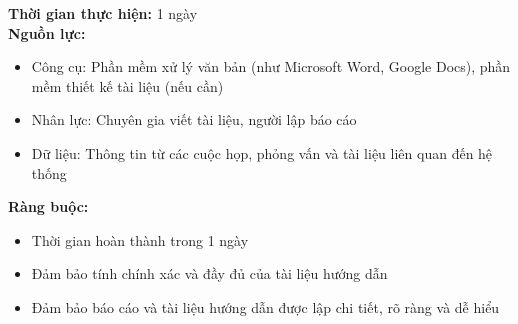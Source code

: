 {\begin{minipage}{\textwidth}
\begin{itemize}
    \end{itemize}
    \noindent \textbf{Thời gian thực hiện:} 1 ngày \\
    \noindent \textbf{Nguồn lực:}
    \begin{itemize}
        \item Công cụ: Phần mềm xử lý văn bản (như Microsoft Word, Google Docs), phần mềm thiết kế tài liệu (nếu cần)
        \item Nhân lực: Chuyên gia viết tài liệu, người lập báo cáo
        \item Dữ liệu: Thông tin từ các cuộc họp, phỏng vấn và tài liệu liên quan đến hệ thống
    \end{itemize}
    \noindent \textbf{Ràng buộc:}
    \begin{itemize}
        \item Thời gian hoàn thành trong 1 ngày
        \item Đảm bảo tính chính xác và đầy đủ của tài liệu hướng dẫn
        \item Đảm bảo báo cáo và tài liệu hướng dẫn được lập chi tiết, rõ ràng và dễ hiểu
    \end{itemize}
    \end{minipage}
}
\newpage
{}    
